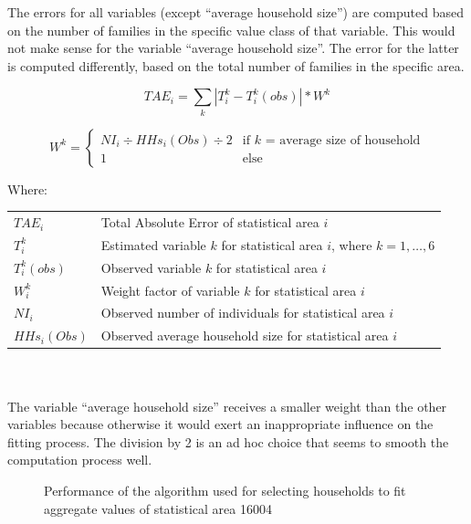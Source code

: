 \documentclass[11pt]{IJM-article}
\begin{document}
The errors for all variables (except ``average household size'') are computed
based on the number of families in the specific value class of that variable.
This would not make sense for the variable ``average household size''. The
error for the latter is computed differently, based on the total number of
families in the specific area.\\

\parbox{\textwidth}{
    \begin{equation} 
        \label{eq:1} 
        TAE_i = \sum_{k} |T_i^{k} - T_i^{k}(obs)| * W^k 
    \end{equation} 
    
    \begin{equation} 
        \label{eq:2} 
        W^k = \begin{cases} 
            NI_{i} \div HHs_{i}(Obs) \div 2 & \text{if $k$ = average size of
                household} \\ 
            1 & \text{else} 
        \end{cases} 
    \end{equation} 

    \noindent Where:\\
    \begin{tabular}{lp{15cm}} 
        $TAE_i$ & Total Absolute Error of statistical area $i$ \\ 
        $T_i^{k}$ & Estimated variable $k$ for statistical area $i$, 
            where $k = 1, \dots , 6$ \\ 
        $T_i^{k}(obs)$ & Observed variable $k$ for statistical area $i$ \\ 
        $W_i^k$ & Weight factor of variable $k$ for statistical area $i$\\
        $NI_{i}$ & Observed number of individuals for statistical area $i$ \\
        $HHs_{i}(Obs)$ & Observed average household size for statistical 
            area $i$ \\
    \end{tabular} 
}\\
\\

The variable ``average household size'' receives a smaller weight than the other
variables because otherwise it would exert an inappropriate influence on the
fitting process. The division by 2 is an ad hoc choice that seems to smooth
the computation process well.\\

\begin{figure}[htb]
    \caption{Performance of the algorithm used for selecting households to fit
    aggregate values of statistical area 16004}\label{fig:4}
    \centering 
    
\end{figure}
\end{document}
